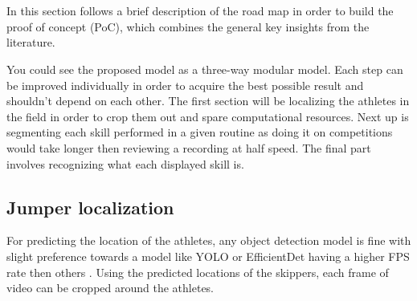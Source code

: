 
\chapter{}%
\label{ch:methodologie}


In this section follows a brief description of the road map in order to build the proof of concept (PoC), which combines the general key insights from the literature.

You could see the proposed model as a three-way modular model. Each step can be improved individually in order to acquire the best possible result and shouldn't depend on each other.
The first section will be localizing the athletes in the field in order to crop them out and spare computational resources. Next up is segmenting each skill performed in a given routine as doing it on competitions would take longer then reviewing a recording at half speed. The final part involves recognizing what each displayed skill is.

\section{Jumper localization}

For predicting the location of the athletes, any object detection model is fine with slight preference towards a model like YOLO or EfficientDet having a higher FPS rate then others \autocite{Zaidi_2021}.
Using the predicted locations of the skippers, each frame of video can be cropped around the athletes.

